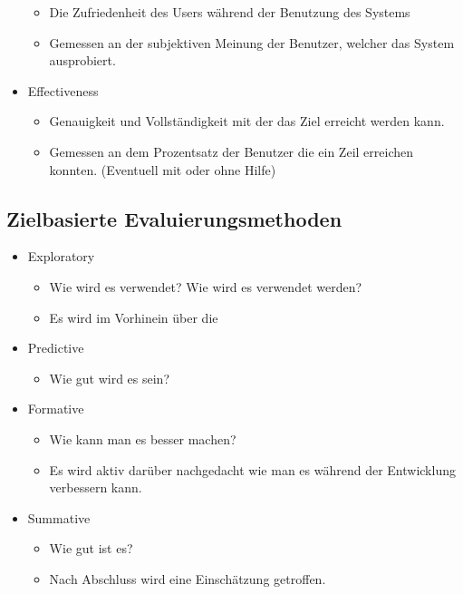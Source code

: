 \documentclass{article}
\begin{document}
\begin{itemize}
		\begin{itemize}
			\item{Die Zufriedenheit des Users während der Benutzung des Systems}
			\item{Gemessen an der subjektiven Meinung der Benutzer, welcher das System ausprobiert.}
		\end{itemize}
		\item{Effectiveness}
		\begin{itemize}
			\item{Genauigkeit und Vollständigkeit mit der das Ziel erreicht werden kann.}
			\item{Gemessen an dem Prozentsatz der Benutzer die ein Zeil erreichen konnten. (Eventuell mit oder ohne Hilfe)}
		\end{itemize}
	\end{itemize}
	\subsection{Zielbasierte Evaluierungsmethoden}
	\begin{itemize}
		\item{Exploratory}
		\begin{itemize}
			\item{Wie wird es verwendet? Wie wird es verwendet werden?}
			\item{Es wird im Vorhinein über die }
		\end{itemize}
		\item{Predictive}
		\begin{itemize}
			\item{Wie gut wird es sein?}
		\end{itemize}
		\item{Formative}
		\begin{itemize}
			\item{Wie kann man es besser machen?}
			\item{Es wird aktiv darüber nachgedacht wie man es während der Entwicklung verbessern kann.}
		\end{itemize}
			\item{Summative}
		\begin{itemize}
			\item{Wie gut ist es?}
			\item{Nach Abschluss wird eine Einschätzung getroffen.}
		\end{itemize}
	\end{itemize}
\end{document}
